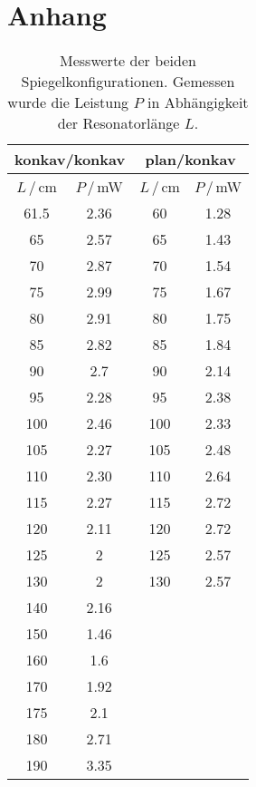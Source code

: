 \newpage
\section{Anhang}

\begin{table}
    \center
    \caption{Messwerte der beiden Spiegelkonfigurationen. Gemessen wurde die Leistung $P$ in Abhängigkeit der Resonatorlänge $L$.}
    \begin{tabular}{c c | c c}
        \multicolumn{2}{|c|}{konkav/konkav} &\multicolumn{2}{|c|}{plan/konkav} \\
        \hline
        $L\,/\,$cm & $P\,/\,$mW & $L\,/\,$cm & $P\,/\,$mW\\
        \midrule
        61.5&        2.36&  60& 1.28\\
        65  &        2.57&  65& 1.43\\
        70  &        2.87&  70& 1.54\\
        75  &        2.99&  75& 1.67\\
        80  &        2.91&  80& 1.75\\
        85  &        2.82&  85& 1.84\\
        90  &        2.7&   90& 2.14\\
        95  &        2.28&  95& 2.38\\
        100 &        2.46&  100&2.33\\
        105 &        2.27&  105&2.48\\
        110 &        2.30&  110&2.64\\
        115 &        2.27&  115&2.72\\
        120 &        2.11&  120&2.72\\
        125 &        2&     125&2.57\\
        130 &        2&     130&2.57\\
        140 &        2.16&  &\\
        150 &        1.46&  &\\
        160 &        1.6&  &\\
        170 &        1.92&  &\\
        175 &        2.1&  &\\
        180 &        2.71&  &\\
        190 &        3.35&  &\\
        \bottomrule
    \end{tabular}
    \label{tab:stabil}
\end{table}

